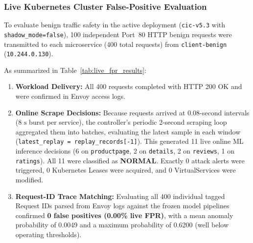\subsubsection{Live Kubernetes Cluster False-Positive Evaluation}
To evaluate benign traffic safety in the active deployment (\texttt{cic-v5.3} with \texttt{shadow\_mode=false}), 100 independent Port~80 HTTP benign requests were transmitted to each microservice (400 total requests) from \texttt{client-benign} (\texttt{10.244.0.130}). 

As summarized in Table~\ref{tab:live_fpr_results}:
\begin{enumerate}
    \item \textbf{Workload Delivery:} All 400 requests completed with HTTP 200 OK and were confirmed in Envoy access logs.
    \item \textbf{Online Scrape Decisions:} Because requests arrived at 0.08-second intervals ($8\text{ s}$ burst per service), the controller's periodic 2-second scraping loop aggregated them into batches, evaluating the latest sample in each window (\texttt{latest\_replay = replay\_records[-1]}). This generated 11 live online ML inference decisions (6 on \texttt{productpage}, 2 on \texttt{details}, 2 on \texttt{reviews}, 1 on \texttt{ratings}). All 11 were classified as \textbf{NORMAL}. Exactly 0 attack alerts were triggered, 0 Kubernetes Leases were acquired, and 0 VirtualServices were modified.
    \item \textbf{Request-ID Trace Matching:} Evaluating all 400 individual tagged Request IDs parsed from Envoy logs against the frozen model pipelines confirmed \textbf{0 false positives (0.00\% live FPR)}, with a mean anomaly probability of 0.0049 and a maximum probability of 0.6200 (well below operating thresholds).
\end{enumerate}

\begin{table}[h]
\centering
\caption{Live Kubernetes False-Positive Evaluation Across All Four Microservices ($N = 400$ Total Requests).}
\label{tab:live_fpr_results}
\end{table}

